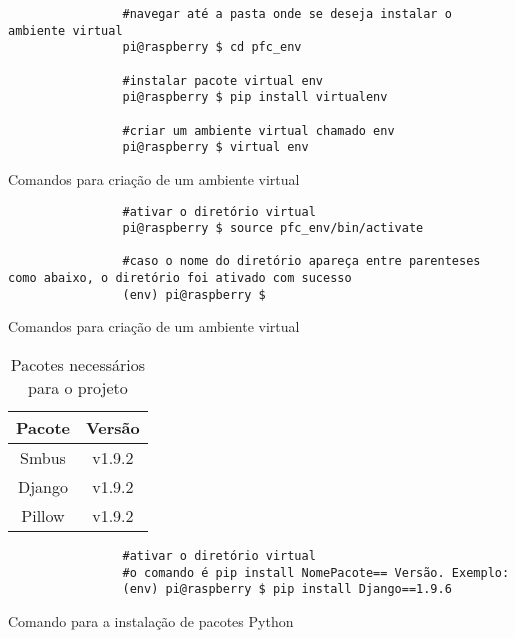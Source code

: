 			\begin{listing}[!htb]
				\begin{verbatim}
				#navegar até a pasta onde se deseja instalar o ambiente virtual
				pi@raspberry $ cd pfc_env
				
				#instalar pacote virtual env
				pi@raspberry $ pip install virtualenv
				
				#criar um ambiente virtual chamado env
				pi@raspberry $ virtual env			
				\end{verbatim}
				\caption{Comandos para criação de um ambiente virtual}
			\label{cod:venv}
			\end{listing}
		
			\begin{listing}[!htb]
				\begin{verbatim}
				#ativar o diretório virtual
				pi@raspberry $ source pfc_env/bin/activate
				
				#caso o nome do diretório apareça entre parenteses como abaixo, o diretório foi ativado com sucesso
				(env) pi@raspberry $ 		
				\end{verbatim}
				\caption{Comandos para criação de um ambiente virtual}
				\label{cod:activate_venv}
			\end{listing}

			
			\begin{table}[!htb]
				\centering
				\caption{Pacotes necessários para o projeto}
				\label{tbl6}
				\def\arraystretch{1.3}
				\begin{tabular}{c c}
					\hline
					\multicolumn{1}{c}{\textbf{Pacote}} & \multicolumn{1}{c}{\textbf{Versão}} \\ \hline
					
					Smbus & v1.9.2 \\
					Django & v1.9.2 \\ %
					Pillow & v1.9.2 \\ %
					\hline
				\end{tabular}
			\end{table}
		
			\begin{listing}[!htb]
				\begin{verbatim}
				#ativar o diretório virtual
				#o comando é pip install NomePacote== Versão. Exemplo:
				(env) pi@raspberry $ pip install Django==1.9.6					
				\end{verbatim}
				\caption{Comando para a instalação de pacotes Python}
				\label{cod:install}
			\end{listing}
		
